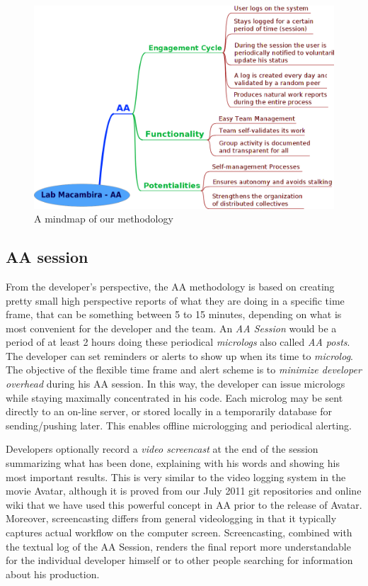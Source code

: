 \documentclass{article}
\begin{document}
\begin{figure}
\begin{center}
   \includegraphics[width=0.8\linewidth,keepaspectratio=true]{figs/aa-mm.png}
\end{center}
   \caption{
   A mindmap of our methodology
   }
\label{fig:mm}
\end{figure}

\subsection{AA session}

From the developer's perspective, the AA methodology is based on
creating pretty small high perspective reports of what they are doing
in a specific time frame, that can be something between 5 to 15
minutes, depending on what is most convenient for the developer and the team. An
\emph{AA Session} would be a period of at least 2 hours doing these periodical
\emph{micrologs} also called \emph{AA posts}. The developer can set reminders or alerts to show up when its time to
\emph{microlog}. The objective of the flexible time frame and
alert scheme is to \emph{minimize developer overhead} during his AA session. In
this way, the developer can issue micrologs while staying maximally concentrated in his
code. Each microlog may be sent directly to an on-line server, or stored
locally in a temporarily database for sending/pushing later. This enables
offline micrologging and periodical alerting.

Developers optionally record a \emph{video screencast} at the end of the
session summarizing what has been done, explaining with his words and
showing his most important results. This is very similar to the video logging system
in the movie Avatar, although it is proved from our July 2011 git repositories and online
wiki that we have used this powerful concept in AA prior to the release of
Avatar. Moreover, screencasting differs from general videologging in that it
typically captures actual workflow on
the computer screen. Screencasting, combined with the textual log of the AA
Session, renders the final report more understandable for the individual developer himself
or to other people searching for information about his production.
\end{document}
